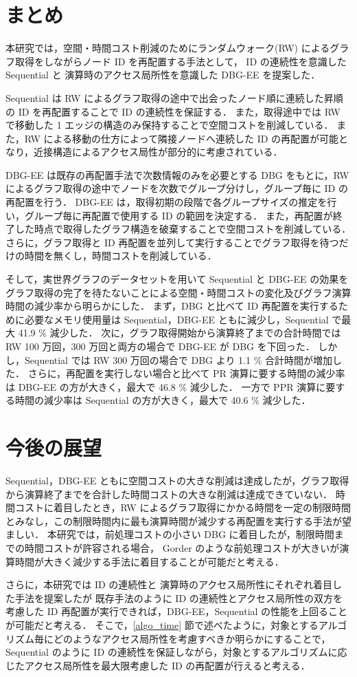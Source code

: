 \section{まとめ}
本研究では，空間・時間コスト削減のためにランダムウォーク(RW) によるグラフ取得をしながらノード ID を再配置する手法として，
ID の連続性を意識した Sequential と 演算時のアクセス局所性を意識した DBG-EE を提案した．

Sequential は RW によるグラフ取得の途中で出会ったノード順に連続した昇順の ID を再配置することで ID の連続性を保証する．
また，取得途中では RW で移動した 1 エッジの構造のみ保持することで空間コストを削減している．
また，RW による移動の仕方によって隣接ノードへ連続した ID の再配置が可能となり，近接構造によるアクセス局性が部分的に考慮されている．

DBG-EE は既存の再配置手法で次数情報のみを必要とする DBG をもとに，RW によるグラフ取得の途中でノードを次数でグループ分けし，グループ毎に ID の再配置を行う．
DBG-EE は，取得初期の段階で各グループサイズの推定を行い，グループ毎に再配置で使用する ID の範囲を決定する．
また，再配置が終了した時点で取得したグラフ構造を破棄することで空間コストを削減している．
さらに，グラフ取得と ID 再配置を並列して実行することでグラフ取得を待つだけの時間を無くし，時間コストを削減している．

そして，実世界グラフのデータセットを用いて Sequential と DBG-EE の効果をグラフ取得の完了を待たないことによる空間・時間コストの変化及びグラフ演算時間の減少率から明らかにした．
まず，DBG と比べて ID 再配置を実行するために必要なメモリ使用量は Sequential，DBG-EE ともに減少し，Sequential で最大 41.9 \% 減少した．
次に，グラフ取得開始から演算終了までの合計時間では RW 100 万回，300 万回と両方の場合で DBG-EE が DBG を下回った．
しかし，Sequential では RW 300 万回の場合で DBG より 1.1 \% 合計時間が増加した．
さらに，再配置を実行しない場合と比べて PR 演算に要する時間の減少率は DBG-EE の方が大きく，最大で 46.8 \% 減少した．
一方で PPR 演算に要する時間の減少率は Sequential の方が大きく，最大で 40.6 \% 減少した．

\section{今後の展望}
Sequential，DBG-EE ともに空間コストの大きな削減は達成したが，グラフ取得から演算終了までを合計した時間コストの大きな削減は達成できていない．
時間コストに着目したとき，RW によるグラフ取得にかかる時間を一定の制限時間とみなし，この制限時間内に最も演算時間が減少する再配置を実行する手法が望ましい．
本研究では，前処理コストの小さい DBG に着目したが，制限時間までの時間コストが許容される場合，
Gorder のような前処理コストが大きいが演算時間が大きく減少する手法に着目することが可能だと考える．

さらに，本研究では ID の連続性と 演算時のアクセス局所性にそれぞれ着目した手法を提案したが
既存手法のように ID の連続性とアクセス局所性の双方を考慮した ID 再配置が実行できれば，DBG-EE，Sequential の性能を上回ることが可能だと考える．
そこで，\ref{algo_time} 節で述べたように，対象とするアルゴリズム毎にどのようなアクセス局所性を考慮すべきか明らかにすることで，
Sequential のように ID の連続性を保証しながら，対象とするアルゴリズムに応じたアクセス局所性を最大限考慮した ID の再配置が行えると考える．
